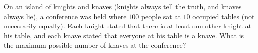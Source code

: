 On an island of knights and knaves (knights always tell the truth, and knaves always lie), a conference was held where $100$ people sat at $10$ occupied tables (not necessarily equally). Each knight stated that there is at least one other knight at his table, and each knave stated that everyone at his table is a knave. What is the maximum possible number of knaves at the conference? 
